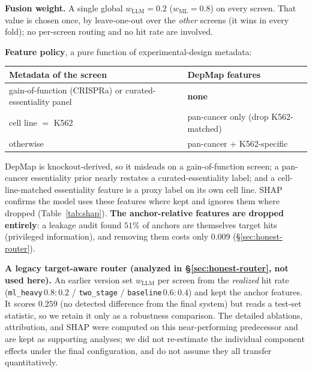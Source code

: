 \documentclass[11pt]{article}
\begin{document}
\noindent
\textbf{Fusion weight.} A single global $w_{\mathrm{LLM}}=0.2$ ($w_{\mathrm{ML}}=0.8$) on every screen.
That value is chosen once, by leave-one-out over the \emph{other} screens (it wins in every fold); no
per-screen routing and no hit rate are involved.

\noindent
\textbf{Feature policy}, a pure function of experimental-design metadata:

\begin{center}\small
\begin{tabular}{ll}
\toprule
Metadata of the screen & DepMap features \\
\midrule
gain-of-function (CRISPRa) or curated-essentiality panel & \textbf{none} \\
cell line $=$ K562                                        & pan-cancer only (drop K562-matched) \\
otherwise                                                 & pan-cancer + K562-specific \\
\bottomrule
\end{tabular}
\end{center}

\noindent
DepMap is knockout-derived, so it misleads on a gain-of-function screen; a pan-cancer essentiality prior
nearly restates a curated-essentiality label; and a cell-line-matched essentiality feature is a proxy
label on its own cell line. SHAP confirms the model uses these features where kept and ignores them where
dropped (Table~\ref{tab:shap}). \textbf{The anchor-relative features are dropped entirely}: a leakage
audit found $51\%$ of anchors are themselves target hits (privileged information), and removing them costs
only $0.009$ (\S\ref{sec:honest-router}).

\noindent
\textbf{A legacy target-aware router (analyzed in \S\ref{sec:honest-router}, not used here).} An earlier
version set $w_{\mathrm{LLM}}$ per screen from the \emph{realized} hit rate
(\texttt{ml\_heavy}\,$0.8{:}0.2$ / \texttt{two\_stage} / \texttt{baseline}\,$0.6{:}0.4$) and kept the
anchor features. It scores $0.259$ (no detected difference from the final system) but reads a test-set
statistic, so we retain it only as a robustness comparison. The detailed ablations, attribution, and SHAP
were computed on this near-performing predecessor and are kept as supporting analyses; we did not
re-estimate the individual component effects under the final configuration, and do not assume they all
transfer quantitatively.
\end{document}

